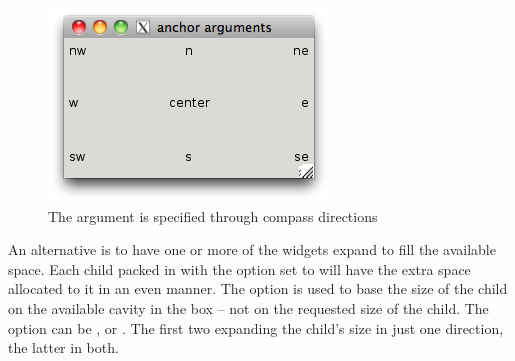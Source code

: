\begin{figure}
  \centering
  \includegraphics[width=.5\textwidth]{fig-tcltk-anchor-compass.png}
  \caption{The  argument is specified through compass directions}
  \label{fig:fig-tcltk-anchor-compass}
\end{figure}


An alternative is to have one or more of the widgets expand to fill
the available space. Each child packed in with the 
option  set to  will have
the extra space allocated  to it in an even manner. The
 option is used to base the size of the child on
the available cavity in the box -- not on the requested size of the
child. The  option can be ,  or
. The first two expanding the child's size in just one
direction, the latter in both.

